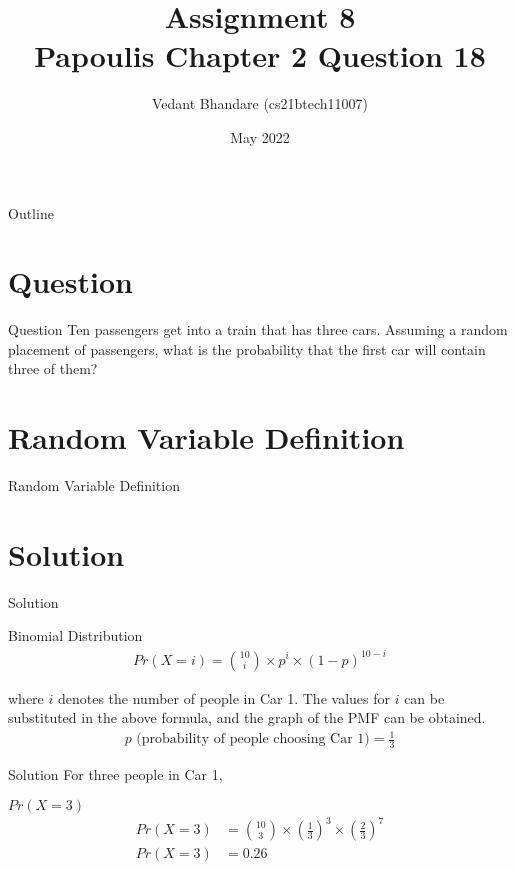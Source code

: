 \documentclass{beamer}
\title{Assignment 8 \\ Papoulis Chapter 2 Question 18}
\author{Vedant Bhandare (cs21btech11007)}
\date{May 2022}
\providecommand{\brak}[1]{\ensuremath{\left(#1\right)}}
\providecommand{\brak}[1]{\ensuremath{\left(#1\right)}}
\begin{document}
\begin{frame}
    \titlepage 
\end{frame}

\logo{}


\begin{frame}{Outline}
    \tableofcontents
\end{frame}

\section{Question}
\begin{frame}{Question}
Ten passengers get into a train that  has three cars. Assuming a random placement of passengers, what is the probability that the first car will contain three of them?
\end{frame}

\section{Random Variable Definition}
\begin{frame}{Random Variable Definition}
\small{    
    \begin{table}[ht!]
    \centering
    
    \caption{Random Variables}
    \label{table:table1}
    \end{table}
}
\end{frame}

\section{Solution}
\begin{frame}{Solution}
\begin{block}{Binomial Distribution}
\begin{align}
    Pr(X = i) = {10 \choose i} \times p^i \times (1 - p)^{10 - i}
\end{align}
\end{block}
where $i$ denotes the number of people in Car 1. The values for $i$ can be substituted in the above formula, and the graph of the PMF can be obtained.\\
\begin{align}
 p \text{ (probability of people choosing Car 1)} = \frac{1}{3}
 \end{align}
\end{frame}

\begin{frame}{Solution}
    For three people in Car 1,\\
    \begin{block}{$Pr(X = 3)$}
    \begin{align}
        Pr(X = 3) &= {10 \choose 3} \times \brak{\frac{1}{3}}^3 \times \brak{\frac{2}{3}}^7\\
        Pr(X = 3) &= 0.26
    \end{align}
    \end{block}
\end{frame}
\end{document}
